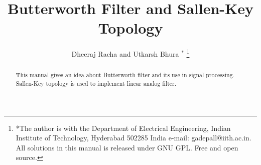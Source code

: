 \documentclass[journal,12pt,twocolumn]{IEEEtran}
\renewcommand\thesection{\arabic{section}}
\begin{document}
\makeatletter
{}
\makeatother
\let\StandardTheFigure\thefigure
\renewcommand{\thefigure}{\thesection}
\makeatletter
{}
\makeatother
\let\StandardTheFigure\thefigure
\let\StandardTheTable\thetable
\let\vec\mathbf
\def\putbox#1#2#3{\makebox[0in][l]{\makebox[#1][l]{}\raisebox{\baselineskip}[0in][0in]{\raisebox{#2}[0in][0in]{#3}}}}
     \def\rightbox#1{\makebox[0in][r]{#1}}
     \def\centbox#1{\makebox[0in]{#1}}
     \def\topbox#1{\raisebox{-\baselineskip}[0in][0in]{#1}}
     \def\midbox#1{\raisebox{-0.5\baselineskip}[0in][0in]{#1}}
\vspace{3cm}
\title{ 
Butterworth Filter and Sallen-Key Topology
}
\author{ Dheeraj Racha and Utkarsh Bhura $^{*}$%
	\thanks{*The author is with the Department
		of Electrical Engineering, Indian Institute of Technology, Hyderabad
		502285 India e-mail:  gadepall@iith.ac.in. All solutions in this manual is released under GNU 
GPL.  Free and open source.}
	
}
\maketitle
\tableofcontents
\bigskip
\renewcommand{\thefigure}{\theenumi}
\renewcommand{\thetable}{\theenumi}
\begin{abstract}
This manual gives an idea about Butterworth filter and its use in signal processing. Sallen-Key topology is used to implement linear analog filter.   
\end{abstract}
\end{document}
